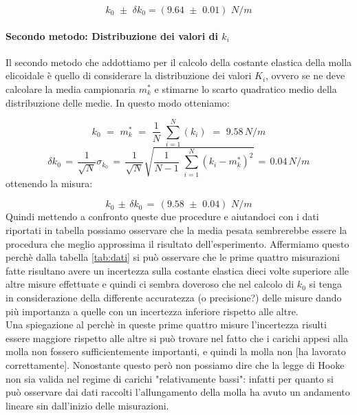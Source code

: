 \begin{equation}
	k_0 \,\, \pm \,\, \delta k_0 =  (9.64 \,\, \pm \,\, 0.01) \,\,N/m
\end{equation}

\paragraph{Secondo metodo: Distribuzione dei valori di $k_i$\\}
Il secondo metodo che addottiamo per il calcolo della costante elastica della molla elicoidale è quello di considerare la distribuzione dei valori $K_i$, ovvero se ne deve calcolare la media campionaria $m^*_k$ e stimarne lo scarto quadratico medio della distribuzione delle medie. In questo modo otteniamo:

\begin{equation*}
	k_0 \,\,=\,\, m^*_k \,\,=\,\, \frac{1}{N}\,\,\sum_{i=1}^{N} (k_i) \,\,=\,\, 9.58  \,N/m
\end{equation*}
%
\begin{equation*}
	\delta k_0  \,=\, \frac{1}{\sqrt{N}} \sigma_{k_0} \,=\, \frac{1}{\sqrt{N}}\sqrt{\frac{1}{N - 1}\,\,\sum_{i=1}^{N} (k_i - m^*_k)^2}\,=\, 0.04 \,N/m
\end{equation*}
%
ottenendo la misura:

\begin{equation}
		k_0 \, \pm \, \delta k_0 \,=\, (9.58 \,\, \pm \,\, 0.04)\,\, N/m
\end{equation}
%
Quindi mettendo a confronto queste due procedure e aiutandoci con i dati riportati in tabella possiamo osservare che la media pesata sembrerebbe essere la procedura che meglio approssima il risultato dell'esperimento. Affermiamo questo perchè dalla tabella \ref{tab:dati} si può osservare che le prime quattro misurazioni fatte risultano avere un incertezza sulla costante elastica dieci volte superiore alle altre misure effettuate e quindi ci sembra doveroso che nel calcolo di $k_0$ si tenga in considerazione della differente accuratezza (o precisione?) delle misure dando più importanza a quelle con un incertezza inferiore rispetto alle altre.\\
Una spiegazione al perchè in queste prime quattro misure l'incertezza risulti essere maggiore rispetto alle altre si può trovare nel fatto che i carichi appesi alla molla non fossero sufficientemente importanti, e quindi la molla non [ha lavorato correttamente]. Nonostante questo però non possiamo dire che la legge di Hooke non sia valida nel regime di carichi "relativamente bassi": infatti per quanto si può osservare dai dati raccolti l'allungamento della molla ha avuto un andamento lineare sin dall'inizio delle misurazioni.

